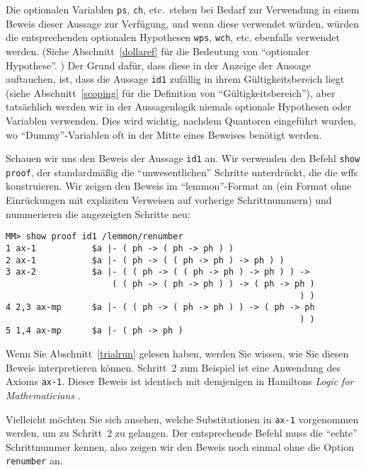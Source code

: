 Die optionalen Variablen  \texttt{ps}, \texttt{ch}, etc.\ stehen bei Bedarf zur Verwendung in einem Beweis dieser Aussage zur Verfügung, und wenn diese verwendet würden, würden die entsprechenden optionalen Hypothesen \texttt{wps}, \texttt{wch}, etc. ebenfalls verwendet werden. (Siehe Abschnitt~\ref{dollaref} für die Bedeutung von "`optionaler Hypothese"'. ) Der Grund dafür, dass diese in der Anzeige der Aussage auftauchen, ist, dass die Aussage \texttt{id1} zufällig in ihrem Gültigkeitsbereich liegt (siehe Abschnitt~\ref{scoping} für die Definition von "`Gültigkeitsbereich"'), aber tatsächlich werden wir in der Aussagenlogik niemals optionale Hypothesen oder Variablen verwenden.  Dies wird wichtig, nachdem Quantoren eingeführt wurden, wo "`Dummy"'-Variablen oft in der Mitte eines Beweises benötigt werden.

Schauen wir uns den Beweis der Aussage \texttt{id1} an.  Wir verwenden den Befehl \texttt{show proof}, der standardmäßig die "`unwesentlichen"' Schritte unterdrückt, die die wffs konstruieren. Wir zeigen den Beweis im "`lemmon"'-Format an (ein Format ohne Einrückungen mit expliziten Verweisen auf vorherige Schrittnummern) und nummerieren die angezeigten Schritte neu:

\begin{verbatim}
MM> show proof id1 /lemmon/renumber
1 ax-1           $a |- ( ph -> ( ph -> ph ) )
2 ax-1           $a |- ( ph -> ( ( ph -> ph ) -> ph ) )
3 ax-2           $a |- ( ( ph -> ( ( ph -> ph ) -> ph ) ) ->
                     ( ( ph -> ( ph -> ph ) ) -> ( ph -> ph )
                                                          ) )
4 2,3 ax-mp      $a |- ( ( ph -> ( ph -> ph ) ) -> ( ph -> ph
                                                          ) )
5 1,4 ax-mp      $a |- ( ph -> ph )
\end{verbatim}

Wenn Sie Abschnitt~\ref{trialrun} gelesen haben, werden Sie wissen, wie Sie diesen Beweis interpretieren können.  Schritt~2 zum Beispiel ist eine Anwendung des Axioms \texttt{ax-1}.  Dieser Beweis ist identisch mit demjenigen in Hamiltons {\em Logic for Mathematicians} \cite[S.~32]{Hamilton}.

Vielleicht möchten Sie sich ansehen, welche Substitutionen in \texttt{ax-1} vorgenommen werden, um zu Schritt~2 zu gelangen. Der entsprechende Befehl muss die "`echte"' Schrittnummer kennen, also zeigen wir den Beweis noch einmal ohne die Option \texttt{renumber} an.

